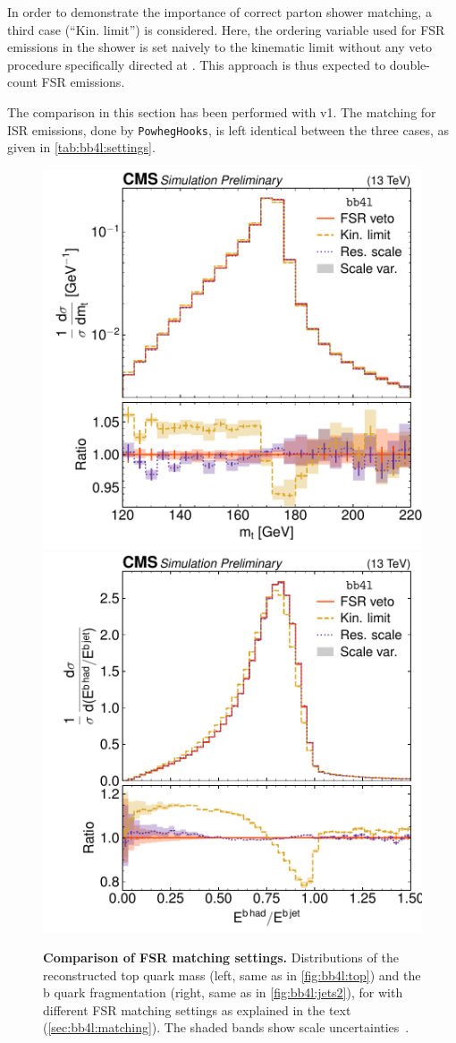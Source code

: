 In order to demonstrate the importance of correct parton shower matching, a third case (``Kin. limit'') is considered. Here, the ordering variable used for FSR emissions in the shower is set naively to the kinematic limit without any veto procedure specifically directed at \bbfourl. This approach is thus expected to double-count FSR emissions.

The comparison in this section has been performed with \bbfourl v1. The matching for ISR emissions, done by \texttt{PowhegHooks}, is left identical between the three cases, as given in \cref{tab:bb4l:settings}.

\begin{figure}[tp]
    \centering
    \includegraphics[width=0.49 \textwidth]{figures/bb4l/matching/ADDED_top_mass.pdf}
    \hfill
    \includegraphics[width=0.49 \textwidth]{figures/bb4l/matching/MC_HFJETS_efracB.pdf}
    \caption{\textbf{Comparison of FSR matching settings.} Distributions of the reconstructed top quark mass (left, same as in \cref{fig:bb4l:top}) and the b quark fragmentation (right, same as in \cref{fig:bb4l:jets2}), for \bbfourl with different FSR matching settings as explained in the text (\cref{sec:bb4l:matching}). The shaded bands show scale uncertainties~\cite{CMS:NOTE-2023-015}.}
    \label{fig:bb4l:matching}
\end{figure}

